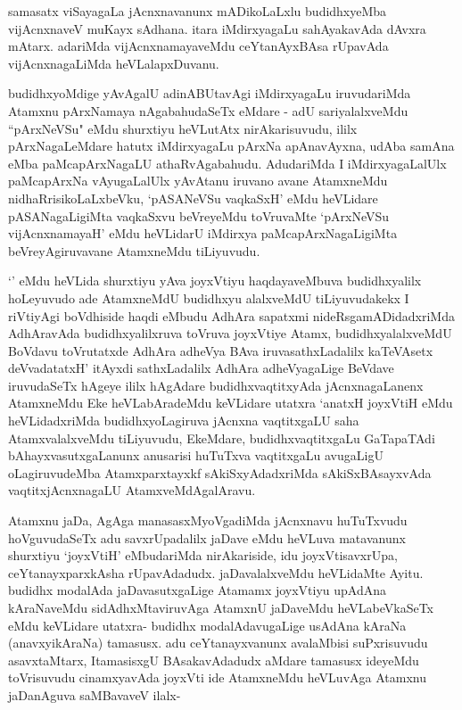\begin{artha}
samasatx viSayagaLa jAcnxnavanunx mADikoLaLxlu budidhxyeMba vijAcnxnaveV muKayx sAdhana. itara iMdirxyagaLu sahAyakavAda dAvxra mAtarx. adariMda vijAcnxnamayaveMdu ceYtanAyxBAsa rUpavAda vijAcnxnagaLiMda heVLalapxDuvanu.
\end{artha}


\begin{artha}
budidhxyoMdige yAvAgalU adinABUtavAgi iMdirxyagaLu iruvudariMda Atamxnu pArxNamaya nAgabahudaSeTx eMdare - adU sariyalalxveMdu ``pArxNeVSu" eMdu shurxtiyu heVLutAtx nirAkarisuvudu, ililx pArxNagaLeMdare hatutx iMdirxyagaLu pArxNa apAnavAyxna, udAba samAna eMba paMcapArxNagaLU athaRvAgabahudu. AdudariMda I iMdirxyagaLalUlx paMcapArxNa vAyugaLalUlx yAvAtanu iruvano avane AtamxneMdu nidhaRrisikoLaLxbeVku, `pASANeVSu vaqkaSxH' eMdu heVLidare pASANagaLigiMta vaqkaSxvu beVreyeMdu toVruvaMte `pArxNeVSu vijAcnxnamayaH' eMdu heVLidarU iMdirxya paMcapArxNagaLigiMta beVreyAgiruvavane AtamxneMdu tiLiyuvudu. 
\end{artha}%


\begin{artha}
`\stext ' eMdu heVLida shurxtiyu yAva joyxVtiyu haqdayaveMbuva budidhxyalilx hoLeyuvudo ade AtamxneMdU budidhxyu alalxveMdU tiLiyuvudakekx I riVtiyAgi boVdhiside haqdi eMbudu AdhAra sapatxmi nideRsgamADidadxriMda AdhAravAda budidhxyalilxruva toVruva joyxVtiye Atamx, budidhxyalalxveMdU BoVdavu toVrutatxde AdhAra adheVya BAva iruvasathxLadalilx kaTeVAsetx deVvadatatxH' itAyxdi sathxLadalilx AdhAra adheVyagaLige BeVdave iruvudaSeTx hAgeye ililx hAgAdare budidhxvaqtitxyAda jAcnxnagaLanenx AtamxneMdu Eke heVLabAradeMdu keVLidare utatxra `anatxH joyxVtiH eMdu heVLidadxriMda budidhxyoLagiruva jAcnxna vaqtitxgaLU saha AtamxvalalxveMdu tiLiyuvudu, EkeMdare, budidhxvaqtitxgaLu GaTapaTAdi bAhayxvasutxgaLanunx anusarisi huTuTxva vaqtitxgaLu avugaLigU oLagiruvudeMba Atamxparxtayxkf sAkiSxyAdadxriMda sAkiSxBAsayxvAda vaqtitxjAcnxnagaLU AtamxveMdAgalAravu. 
\end{artha}


\begin{artha}
Atamxnu jaDa, AgAga manasasxMyoVgadiMda jAcnxnavu huTuTxvudu hoVguvudaSeTx adu savxrUpadalilx jaDave eMdu heVLuva matavanunx shurxtiyu `joyxVtiH' eMbudariMda nirAkariside, idu joyxVtisavxrUpa, ceYtanayxparxkAsha rUpavAdadudx. jaDavalalxveMdu heVLidaMte Ayitu. budidhx modalAda jaDavasutxgaLige Atamamx joyxVtiyu upAdAna kAraNaveMdu sidAdhxMtaviruvAga AtamxnU jaDaveMdu heVLabeVkaSeTx eMdu keVLidare utatxra- budidhx modalAdavugaLige usAdAna kAraNa (anavxyikAraNa) tamasusx. adu ceYtanayxvanunx avalaMbisi suPxrisuvudu asavxtaMtarx, ItamasisxgU BAsakavAdadudx aMdare tamasusx ideyeMdu toVrisuvudu cinamxyavAda joyxVti ide AtamxneMdu heVLuvAga Atamxnu jaDanAguva saMBavaveV ilalx-
\end{artha}

